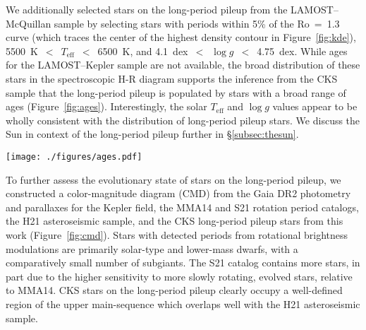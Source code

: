 \documentclass[trackchanges,twocolumn]{aastex631}
\newcommand{\lamostkep}{LAMOST--Kepler\xspace}
\newcommand{\lamostmcq}{LAMOST--McQuillan\xspace}
\newcommand{\jvs}{vS19\xspace}
\newcommand{\mma}{MMA14\xspace}
\newcommand{\hall}{H21\xspace}
\newcommand{\santos}{S21\xspace}
\newcommand{\teff}{\ensuremath{T_{\mathrm{eff}}}\xspace}
\newcommand{\logg}{\ensuremath{\log g}\xspace}
\begin{document}
We additionally selected stars on the long-period pileup from the \lamostmcq sample by selecting stars with periods within 5\% of the Ro~=~1.3 curve (which traces the center of the highest density contour in Figure~\ref{fig:kde}), 5500~K~$<$~\teff~$<$~6500~K, and 4.1~dex~$<$~\logg~$<$~4.75~dex. While ages for the \lamostkep sample are not available, the broad distribution of these stars in the spectroscopic H-R diagram supports the inference from the CKS sample that the long-period pileup is populated by stars with a broad range of ages (Figure~\ref{fig:ages}). Interestingly, the solar \teff and \logg values appear to be wholly consistent with the distribution of long-period pileup stars. We discuss the Sun in context of the long-period pileup further in \S\ref{subsec:thesun}.

\begin{figure*}
    \centering
    \texttt{[image: ./figures/ages.pdf]}
    \caption{Above, H-R diagram placement of long-period pileup stars relative to the Sun and the CKS sample (a) and similarly for the \lamostmcq sample (b). Below, the \teff-age plane for CKS stars along the long-period pileup using isochrone ages from the CKS (c) and SPOCS (d) catalogs. The light shaded points represent predictions from the WMB model of \jvs for stars with Ro~$<$~2 (blue) and Ro~$>$~2 (orange). Note, panels (a), (c), and (d) all pertain to the CKS sample, whereas panel (b) relates to the \lamostmcq sample, for which homogeneous ages have not been published.}
    \label{fig:ages}
\end{figure*}

To further assess the evolutionary state of stars on the long-period pileup, we constructed a color-magnitude diagram (CMD) from the Gaia DR2 photometry and parallaxes for the Kepler field, the \mma and \santos rotation period catalogs, the \hall asteroseismic sample, and the CKS long-period pileup stars from this work (Figure~\ref{fig:cmd}). Stars with detected periods from rotational brightness modulations are primarily solar-type and lower-mass dwarfs, with a comparatively small number of subgiants. The \santos catalog contains more stars, in part due to the higher sensitivity to more slowly rotating, evolved stars, relative to \mma. CKS stars on the long-period pileup clearly occupy a well-defined region of the upper main-sequence which overlaps well with the \hall asteroseismic sample.
\end{document}
